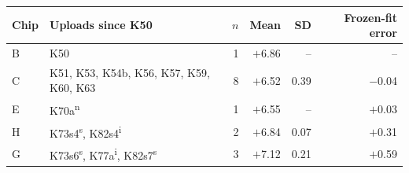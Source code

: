 {\small
\begin{tabular}{@{}lp{5.4cm}rrrr@{}}
\toprule
Chip & Uploads since K50 & $n$ & Mean & SD & Frozen-fit error \\
\midrule
B & K50 & 1 & \ensuremath{+}6.86 & -- & -- \\
C & K51, K53, K54b, K56, K57, K59, K60, K63 & 8 & \ensuremath{+}6.52 & 0.39 & \ensuremath{-}0.04 \\
E & K70a\textsuperscript{n} & 1 & \ensuremath{+}6.55 & -- & \ensuremath{+}0.03 \\
H & K73s4\textsuperscript{s}, K82s4\textsuperscript{i} & 2 & \ensuremath{+}6.84 & 0.07 & \ensuremath{+}0.31 \\
G & K73s6\textsuperscript{s}, K77a\textsuperscript{i}, K82s7\textsuperscript{s} & 3 & \ensuremath{+}7.12 & 0.21 & \ensuremath{+}0.59 \\
\bottomrule
\end{tabular}
}
